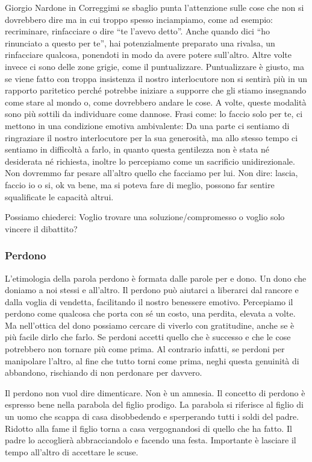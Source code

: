 \documentclass[12pt]{book} %
\begin{document}
Giorgio Nardone in Correggimi se sbaglio punta
l'attenzione sulle cose che non si dovrebbero dire ma in cui troppo spesso inciampiamo, come ad
esempio: recriminare, rinfacciare o dire “te l'avevo detto”. Anche quando dici “ho rinunciato a questo per te”, hai potenzialmente preparato una rivalsa, un rinfacciare qualcosa, ponendoti in modo da avere potere sull'altro. Altre volte invece ci sono delle zone grigie, come il puntualizzare. Puntualizzare è giusto, ma se viene
fatto con troppa insistenza il nostro interlocutore non si sentirà più in un rapporto paritetico perché potrebbe
iniziare a supporre che gli stiamo insegnando come stare al mondo o, come dovrebbero andare le cose. A volte, queste
modalità sono più sottili da individuare come dannose. Frasi come: lo faccio solo per te, ci mettono in una condizione
emotiva ambivalente: Da una parte ci sentiamo di ringraziare il nostro interlocutore per la sua generosità, ma allo
stesso tempo ci sentiamo in difficoltà a farlo, in quanto questa gentilezza non è stata né desiderata né
richiesta, inoltre lo percepiamo come un sacrificio unidirezionale. Non dovremmo far pesare
all'altro quello che facciamo per lui. Non dire: lascia, faccio io o si, ok va bene, ma si poteva
fare di meglio, possono far sentire squalificate le capacità altrui.

Possiamo chiederci: Voglio trovare una soluzione/compromesso o voglio solo vincere il dibattito? 

\subsubsection{Perdono}
L'etimologia della parola perdono è formata dalle parole per e dono. Un dono che doniamo a noi
stessi e all'altro. Il perdono può aiutarci a liberarci dal rancore e dalla voglia di vendetta, facilitando il nostro benessere emotivo. 
Percepiamo il perdono come qualcosa che porta con sé un costo, una perdita, elevata a volte. Ma nell'ottica del
dono possiamo cercare di viverlo con gratitudine, anche se è più facile dirlo che farlo. Se perdoni accetti quello
che è successo e che le cose potrebbero non tornare più come prima. Al contrario infatti, se perdoni per manipolare l'altro, al
fine che tutto torni come prima, neghi questa genuinità di abbandono, rischiando di non perdonare per davvero.

Il perdono non vuol dire dimenticare. Non è un amnesia. Il concetto di perdono è espresso bene nella parabola del figlio
prodigo. La parabola si riferisce al figlio di un uomo che scappa di casa
disobbedendo e sperperando tutti i soldi del padre. Ridotto alla fame il figlio torna a casa vergognandosi di quello
che ha fatto. Il padre lo accoglierà abbracciandolo e facendo una festa. Importante è lasciare il tempo
all'altro di accettare le scuse.
\end{document}
